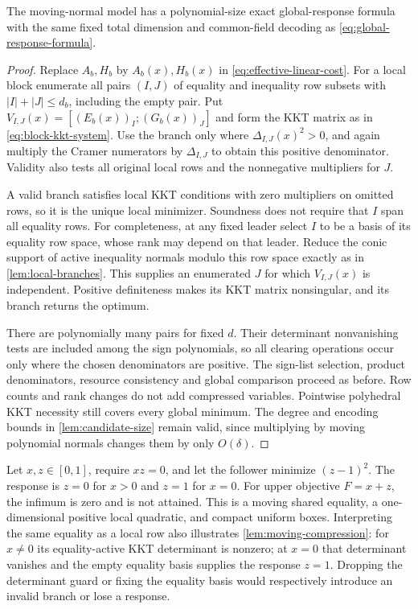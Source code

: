 \begin{lemma}\label{lem:moving-compression}
The moving-normal model has a polynomial-size exact global-response
formula with the same fixed total dimension and common-field decoding
as \eqref{eq:global-response-formula}.
\end{lemma}
\begin{proof}
Replace $A_b,H_b$ by $A_b(x),H_b(x)$ in
\eqref{eq:effective-linear-cost}. For a local block enumerate all pairs
$(I,J)$ of equality and inequality row subsets with
$|I|+|J|\le d_b$, including the empty pair. Put
$V_{I,J}(x)=[(E_b(x))_I;(G_b(x))_J]$ and form the KKT matrix as in
\eqref{eq:block-kkt-system}. Use the branch only where
$\Delta_{I,J}(x)^2>0$, and again multiply the Cramer numerators by
$\Delta_{I,J}$ to obtain this positive denominator. Validity also tests
all original local rows and the nonnegative multipliers for $J$.

A valid branch satisfies local KKT conditions with zero multipliers on
omitted rows, so it is the unique local minimizer. Soundness does not
require that $I$ span all equality rows. For completeness, at any fixed
leader select $I$ to be a basis of its equality row space, whose rank
may depend on that leader. Reduce the conic support of active inequality
normals modulo this row space exactly as in
\cref{lem:local-branches}. This supplies an enumerated $J$ for which
$V_{I,J}(x)$ is independent. Positive definiteness makes its KKT
matrix nonsingular, and its branch returns the optimum.

There are polynomially many pairs for fixed $d$. Their determinant
nonvanishing tests are included among the sign polynomials, so all
clearing operations occur only where the chosen denominators are
positive. The sign-list selection, product denominators, resource
consistency and global comparison proceed as before. Row counts and
rank changes do not add compressed variables. Pointwise polyhedral
KKT necessity still covers every global minimum. The degree and encoding
bounds in \cref{lem:candidate-size} remain valid, since multiplying
by moving polynomial normals changes them by only $O(\delta)$.
\end{proof}

\begin{example}\label{ex:moving-nonattainment}
Let $x,z\in[0,1]$, require $xz=0$, and let the follower minimize
$(z-1)^2$. The response is $z=0$ for $x>0$ and $z=1$ for $x=0$.
For upper objective $F=x+z$, the infimum is zero and is not attained.
This is a moving shared equality, a one-dimensional positive local
quadratic, and compact uniform boxes. Interpreting the same equality
as a local row also illustrates \cref{lem:moving-compression}:
for $x\ne0$ its equality-active KKT determinant is nonzero; at $x=0$
that determinant vanishes and the empty equality basis supplies the
response $z=1$. Dropping the determinant guard or fixing the equality
basis would respectively introduce an invalid branch or lose a response.
\end{example}

